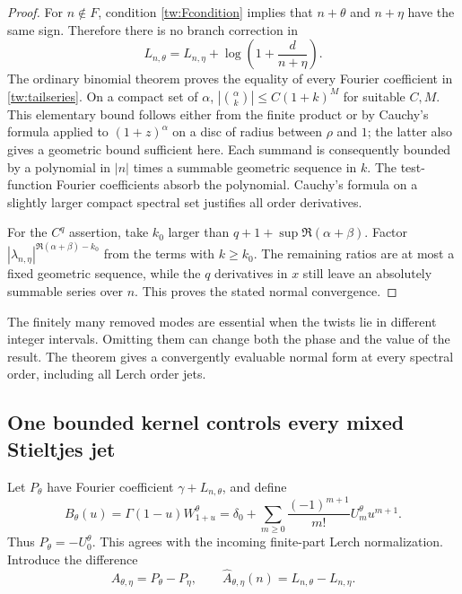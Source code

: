 \documentclass[11pt,a4paper]{article}
\numberwithin{equation}{section}
\theoremstyle{definition}
\theoremstyle{remark}
\begin{document}
\begin{proof}
For $n\notin F$, condition \eqref{tw:Fcondition} implies that
$n+\theta$ and $n+\eta$ have the same sign. Therefore there is no
branch correction in
\[
 L_{n,\theta}=L_{n,\eta}
             +\log\left(1+\frac{d}{n+\eta}\right).
\]
The ordinary binomial theorem proves the equality of every Fourier
coefficient in \eqref{tw:tailseries}. On a compact set of $\alpha$,
$|\binom\alpha k|\le C(1+k)^M$ for suitable $C,M$. This elementary
bound follows either from the finite product or by Cauchy's formula
applied to $(1+z)^\alpha$ on a disc of radius between $\rho$ and
$1$; the latter also gives a geometric bound sufficient here.
Each summand is consequently bounded by a polynomial in $|n|$
times a summable geometric sequence in $k$. The test-function Fourier
coefficients absorb the polynomial. Cauchy's formula on a slightly
larger compact spectral set justifies all order derivatives.

For the $C^q$ assertion, take $k_0$ larger than
$q+1+\sup\Re(\alpha+\beta)$. Factor
$|\lambda_{n,\eta}|^{\Re(\alpha+\beta)-k_0}$ from the terms
with $k\ge k_0$. The remaining ratios are at most a fixed geometric
sequence, while the $q$ derivatives in $x$ still leave an absolutely
summable series over $n$. This proves the stated normal convergence.
\end{proof}

The finitely many removed modes are essential when the twists lie in
different integer intervals. Omitting them can change both the phase and
the value of the result. The theorem gives a convergently evaluable
normal form at every spectral order, including all Lerch order jets.

\subsection{One bounded kernel controls every mixed Stieltjes jet}

Let $P_\theta$ have Fourier coefficient
$\gamma+L_{n,\theta}$, and define
\begin{equation}
 B_\theta(u)=\Gamma(1-u)W_{1+u}^{\theta}
   =\delta_0+\sum_{m\ge0}\frac{(-1)^{m+1}}{m!}
                         U_m^\theta u^{m+1}.
 \label{tw:B}
\end{equation}
Thus $P_\theta=-U_0^\theta$. This agrees with the incoming
finite-part Lerch normalization. Introduce the difference
\begin{equation}
 A_{\theta,\eta}=P_\theta-P_\eta,
 \qquad\widehat A_{\theta,\eta}(n)=L_{n,\theta}-L_{n,\eta}.
 \label{tw:A}
\end{equation}
\end{document}
